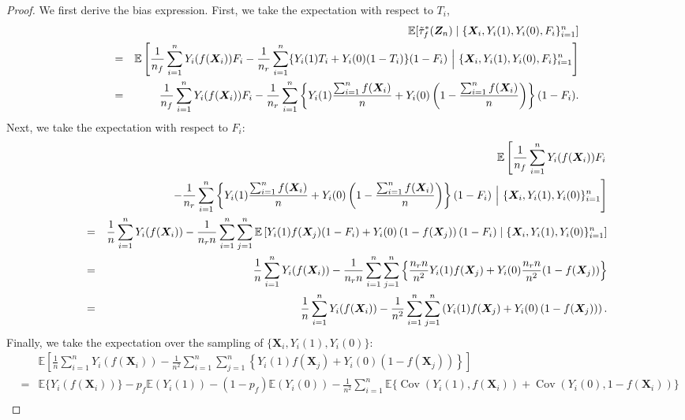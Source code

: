 \documentclass[USenglish,onecolumn]{article}
\DeclareMathOperator\Cov{Cov}
\renewcommand\r{\right}
\renewcommand\l{\left}
\newcommand\E{\mathbb{E}}
\newcommand\bX{\bm{X}}
\newcommand\bZ{\bm{Z}}
\begin{document}
\begin{proof}
  We first derive the bias expression. First, we take the expectation
  with respect to $T_i$,
  \begin{eqnarray*}
    & & \E[\tilde\tau_f^\ast(\bZ_n) \mid \{\bX_i, Y_i(1), Y_i(0), F_i\}_{i=1}^n] \\
    & = &\E\l[\frac{1}{n_f}\sum_{i=1}^{n}
          Y_i(f(\bX_i))F_i-\frac{1}{n_r}
          \sum_{i=1}^n \{Y_i(1)T_i+Y_i(0)(1-T_i)\}(1-F_i) \ \Bigl | \ \{\bX_i,
          Y_i(1), Y_i(0), F_i\}_{i=1}^n\r]\\
    &= &\frac{1}{n_f}\sum_{i=1}^{n}
         Y_i(f(\bX_i))F_i-\frac{1}{n_r}
         \sum_{i=1}^n \l\{Y_i(1)\frac{\sum_{i=1}^n
         f(\bX_i)}{n}+Y_i(0)\l(1-\frac{\sum_{i=1}^n
         f(\bX_i)}{n}\r)\r\}(1-F_i).
  \end{eqnarray*}
  Next, we take the expectation with respect to $F_i$:
  \begin{eqnarray*}
    & &\E\l[\frac{1}{n_f}\sum_{i=1}^{n}
        Y_i(f(\bX_i))F_i \r. \\
    & & \l. \hspace{.5in} -\frac{1}{n_r}
        \sum_{i=1}^n \l\{Y_i(1)\frac{\sum_{i=1}^n
        f(\bX_i)}{n}+Y_i(0)\l(1-\frac{\sum_{i=1}^n
        f(\bX_i)}{n}\r)\r\}(1-F_i) \ \Bigl | \ \{\bX_i, Y_i(1),
        Y_i(0)\}_{i=1}^n  \r]\\
    &= & \frac{1}{n} \sum_{i=1}^n Y_i(f(\bX_i))
         -\frac{1}{n_rn}\sum_{i=1}^{n}\sum_{j=1}^{n}\E\l[Y_i(1)f(\bX_j)(1-F_i)+Y_i(0)\l(1-f(\bX_j)\r)(1-F_i)\mid
         \{\bX_i, Y_i(1), Y_i(0)\}_{i=1}^n\r]\\
		& = & \frac{1}{n} \sum_{i=1}^n
                      Y_i(f(\bX_i)) -
                      \frac{1}{n_rn}
                      \sum_{i=1}^n \sum_{j=1}^n \l\{
                      \frac{n_rn}{n^2}Y_i(1)f(\bX_j)+Y_i(0)\frac{n_rn}{n^2}(1-f(\bX_j))\r\}\\
    &=&\frac{1}{n} \sum_{i=1}^n Y_i(f(\bX_i)) - \frac{1}{n^2}
        \sum_{i=1}^n \sum_{j=1}^n
        \l(Y_i(1)f(\bX_j)+Y_i(0)\l(1-f(\bX_j)\r)\r).
  \end{eqnarray*}
  Finally, we take the expectation over the sampling of
  $\{\bX_i, Y_i(1), Y_i(0)\}$:
  \begin{eqnarray*}
    & &\E\l[\frac{1}{n} \sum_{i=1}^n Y_i(f(\bX_i)) - \frac{1}{n^2}
        \sum_{i=1}^n \sum_{j=1}^n
        \l\{Y_i(1)f(\bX_j)+Y_i(0)\l(1-f(\bX_j)\r)\r\}\r]\\
    &= &
         \E\{Y_i(f(\bX_i))\}-p_f\E(Y_i(1))-\l(1-p_f\r)\E(Y_i(0))-\frac{1}{n^2}\sum_{i=1}^n
         \E\{\Cov(Y_i(1),f(\bX_i))+\Cov(Y_i(0),1-f(\bX_i))\}\\

\end{eqnarray*}
\end{proof}
\end{document}

